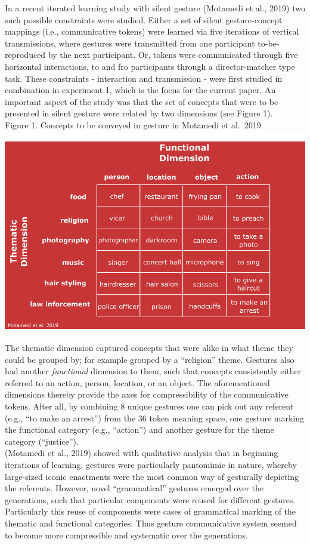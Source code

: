 \documentclass[
  man, noextraspace,floatsintext]{apa6}
\begin{document}
In a recent iterated learning study with silent gesture (Motamedi et al., 2019) two such possible constraints were studied. Either a set of silent gesture-concept mappings (i.e., communicative tokens) were learned via five iterations of vertical transmissions, where gestures were transmitted from one participant to-be-reproduced by the next participant. Or, tokens were communicated through five horizontal interactions, to and fro participants through a director-matcher type task. These constraints - interaction and transmission - were first studied in combination in experiment 1, which is the focus for the current paper. An important aspect of the study was that the set of concepts that were to be presented in silent gesture were related by two dimensions (see Figure 1).\\
Figure 1. Concepts to be conveyed in gesture in Motamedi et al.~2019
\includegraphics{GNet_WP_files/figure-latex/plotconcepts-1.pdf}
The thematic dimension captured concepts that were alike in what theme they could be grouped by; for example grouped by a ``religion'' theme. Gestures also had another \emph{functional} dimension to them, such that concepts consistently either referred to an action, person, location, or an object. The aforementioned dimensions thereby provide the axes for compressibility of the communicative tokens. After all, by combining 8 unique gestures one can pick out any referent (e.g., ``to make an arrest'') from the 36 token meaning space, one gesture marking the functional category (e.g., ``action'') and another gesture for the theme category (``justice'').\\
(Motamedi et al., 2019) showed with qualitative analysis that in beginning iterations of learning, gestures were particularly pantomimic in nature, whereby large-sized iconic enactments were the most common way of gesturally depicting the referents. However, novel ``grammatical'' gestures emerged over the generations, such that particular components were reused for different gestures. Particularly this reuse of components were cases of grammatical marking of the thematic and functional categories. Thus gesture communicative system seemed to become more compressible and systematic over the generations.\\
\end{document}
